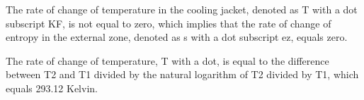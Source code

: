 The rate of change of temperature in the cooling jacket, denoted as T with a dot subscript KF, is not equal to zero, which implies that the rate of change of entropy in the external zone, denoted as s with a dot subscript ez, equals zero.

The rate of change of temperature, T with a dot, is equal to the difference between T2 and T1 divided by the natural logarithm of T2 divided by T1, which equals 293.12 Kelvin.